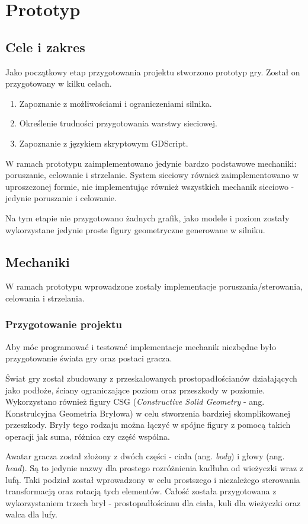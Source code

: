 \chapter{Prototyp}
\section{Cele i zakres}
Jako początkowy etap przygotowania projektu stworzono prototyp gry. Został on przygotowany w kilku celach.
\begin{enumerate}
    \item Zapoznanie z możliwościami i ograniczeniami silnika. 
    \item Określenie trudności przygotowania warstwy sieciowej.
    \item Zapoznanie z językiem skryptowym GDScript. 
\end{enumerate}

W ramach prototypu zaimplementowano jedynie bardzo podstawowe mechaniki: poruszanie, celowanie i strzelanie. System sieciowy również zaimplementowano w uproszczonej formie, nie implementując również wszystkich mechanik sieciowo - jedynie poruszanie i celowanie.

Na tym etapie nie przygotowano żadnych grafik, jako modele i poziom zostały wykorzystane jedynie proste figury geometryczne generowane w silniku.

\section{Mechaniki}
W ramach prototypu wprowadzone zostały implementacje poruszania/sterowania, celowania i strzelania.

\subsection{Przygotowanie projektu}
Aby móc programować i testować implementacje mechanik niezbędne było przygotowanie świata gry oraz postaci gracza. 

Świat gry został zbudowany z przeskalowanych prostopadłościanów działających jako podłoże, ściany ograniczające poziom oraz przeszkody w poziomie. Wykorzystano również figury CSG (\emph{Constructive Solid Geometry} - ang. Konstrulcyjna Geometria Bryłowa) w celu stworzenia bardziej skomplikowanej przeszkody. Bryły tego rodzaju można łączyć w spójne figury z pomocą takich operacji jak suma, różnica czy część wspólna.

Awatar gracza został złożony z dwóch części - ciała (ang. \emph{body}) i głowy (ang. \emph{head}). Są to jedynie nazwy dla prostego rozróżnienia kadłuba od wieżyczki wraz z lufą. Taki podział został wprowadzony w celu prostszego i niezależego sterowania transformacją oraz rotacją tych elementów. Całość została przygotowana z wykorzystaniem trzech brył - prostopadłościanu dla ciała, kuli dla wieżyczki oraz walca dla lufy.


